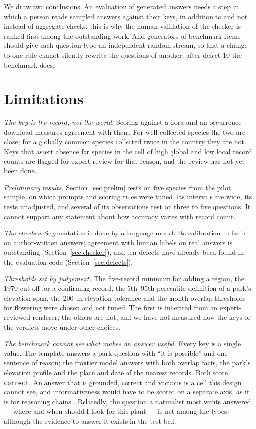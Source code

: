 \documentclass[11pt,a4paper]{article}
\newcommand{\vt}[1]{\texttt{#1}}          %
\begin{document}
We draw two conclusions. An evaluation of generated answers needs a step in which a
person reads sampled answers against their keys, in addition to and not instead of
aggregate checks; this is why the human validation of the checker is ranked first
among the outstanding work. And generators of benchmark items should give each
question type an independent random stream, so that a change to one rule cannot
silently rewrite the questions of another; after defect 10 the benchmark does.

\section{Limitations}\label{sec:limits}

\emph{The key is the record, not the world.} Scoring against a flora and an
occurrence download measures agreement with them. For well-collected species the two
are close; for a globally common species collected twice in the country they are
not. Keys that assert absence for species in the cell of high global and low local
record counts are flagged for expert review for that reason, and the review has not
yet been done.

\emph{Preliminary results.} Section~\ref{sec:prelim} rests on five species from the
pilot sample, on which prompts and scoring rules were tuned. Its intervals are wide,
its tests unadjusted, and several of its observations rest on three to five
questions. It cannot support any statement about how accuracy varies with record
count.

\emph{The checker.} Segmentation is done by a language model. Its calibration so far
is on author-written answers; agreement with human labels on real answers is
outstanding (Section~\ref{sec:checker}), and ten defects have already been found in
the evaluation code (Section~\ref{sec:defects}).

\emph{Thresholds set by judgement.} The five-record minimum for adding a region, the
1970 cut-off for a confirming record, the 5th--95th percentile definition of a park's
elevation span, the 200~m elevation tolerance and the month-overlap thresholds for
flowering were chosen and not tuned. The first is inherited from an expert-reviewed
renderer; the others are not, and we have not measured how the keys or the verdicts
move under other choices.

\emph{The benchmark cannot see what makes an answer useful.} Every key is a single
value. The template answers a park question with ``it is possible'' and one sentence
of reason; the frontier model answers with both overlap facts, the park's elevation
profile and the place and date of the nearest records. Both score \vt{correct}. An
answer that is grounded, correct and vacuous is a cell this design cannot see, and
informativeness would have to be scored on a separate axis, as it is for reasoning
chains \citep{prasad2023receval}. Relatedly, the question a naturalist most wants
answered --- where and when should I look for this plant --- is not among the types,
although the evidence to answer it exists in the test bed.
\end{document}
